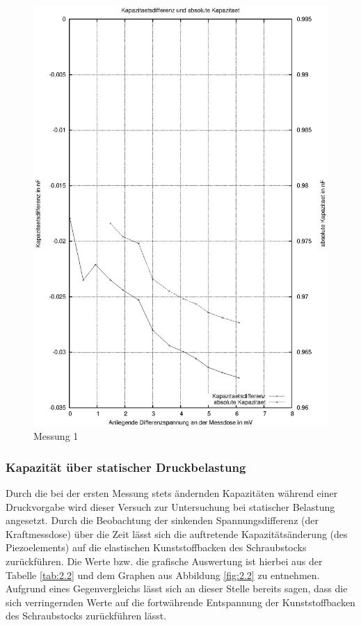 \documentclass[12pt]{scrreprt} %
\begin{document}
\begin {figure}[htbp]
      \begin{center}
        \includegraphics{tabelle2_1_1}
      \end{center}
\caption{Messung 1}
\label{fig:2.1}
\end{figure}

\subsubsection{Kapazität über statischer Druckbelastung}
Durch die bei der ersten Messung stets ändernden Kapazitäten während einer Druckvorgabe wird dieser Versuch zur Untersuchung bei statischer Belastung angesetzt. Durch die Beobachtung der sinkenden Spannungsdifferenz (der Kraftmessdose) über die Zeit lässt sich die auftretende Kapazitätsänderung (des Piezoelements) auf die elastischen Kunststoffbacken des Schraubstocks zurückführen. Die Werte bzw. die grafische Auswertung ist hierbei aus der Tabelle \vref{tab:2.2} und dem Graphen aus Abbildung \vref{fig:2.2} zu entnehmen. \\
Aufgrund eines Gegenvergleichs lässt sich an dieser Stelle bereits sagen, dass die sich verringernden Werte auf die fortwährende Entspannung der Kunststoffbacken des Schraubstocks zurückführen lässt.
\end{document}

